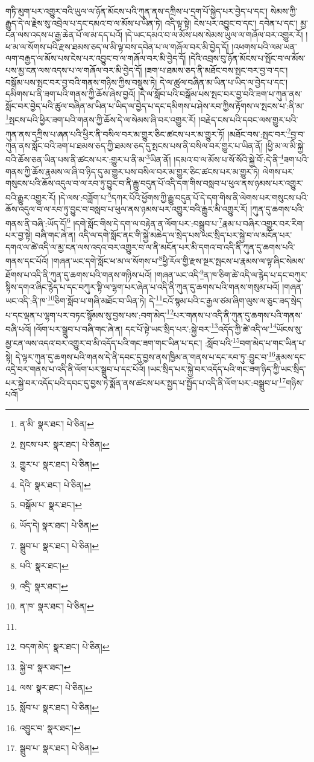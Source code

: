 གཏི་མུག་པར་འགྱུར་བའི་ཡུལ་ལ་ཉོན་མོངས་པའི་ཀུན་ནས་དཀྲིས་པ་དྲག་པོ་སྐྱེད་པར་བྱེད་པ་དང་། སེམས་ཀྱི་རྒྱུད་དེ་ལ་རྗེས་སུ་འབྲེལ་པ་དང་དམའ་བ་ལ་མོས་པ་ཡིན་ཏེ། འདི་ལྟ་སྟེ། ངེས་པར་འབྱུང་བ་དང་། དབེན་པ་དང་། མྱ་ངན་ལས་འདས་པ་རྒྱ་ཆེན་པོ་ལ་མ་དད་པའོ། །དེ་ཡང་དམའ་བ་ལ་མོས་པས་སེམས་ཡུལ་ལ་གཞོལ་བར་འགྱུར་རོ། །ཕ་མ་ལ་སོགས་པའི་རྫས་ཐམས་ཅད་ལ་མི་ལྟ་བས་དབེན་པ་ལ་གཞོལ་བར་མི་བྱེད་དོ། །འཕགས་པའི་ལམ་ཡན་ལག་བརྒྱད་ལ་མོས་པས་ངེས་པར་འབྱུང་བ་ལ་གཞོལ་བར་མི་བྱེད་དོ། །དེའི་འབྲས་བུ་ཉོན་མོངས་པ་སྤོང་བ་ལ་མོས་པས་མྱ་ངན་ལས་འདས་པ་ལ་གཞོལ་བར་མི་བྱེད་དོ། །ཟག་པ་ཐམས་ཅད་ནི་མཐོང་བས་སྤང་བར་བྱ་བ་དང་། བསྒོམ་པས་སྤང་བར་བྱ་བའི་གནས་གཉིས་ཀྱིས་བསྡུས་ཏེ། དེ་ལ་ཚུལ་བཞིན་མ་ཡིན་པ་ཡིད་ལ་བྱེད་པ་དང་། དམིགས་པ་ནི་ཟག་པའི་གནས་ཀྱི་ཆོས་ཞེས་བྱའོ། །དེ་ལ་སློབ་པའི་བསྒོམ་པས་སྤང་བར་བྱ་བའི་ཟག་པ་ཀུན་ནས་སློང་བར་བྱེད་པའི་ཚུལ་བཞིན་མ་ཡིན་པ་ཡིད་ལ་བྱེད་པ་དང་དམིགས་པ་ཤེས་རབ་ཀྱིས་རྟོགས་ལ་སྤངས་པ་:ནི་མ་\footnote{ན་མི་  སྣར་ཐང་།  པེ་ཅིན། }སྤངས་པའི་ཕྱིར་ཟག་པའི་གནས་ཀྱི་ཆོས་དེ་ལ་སེམས་ཞི་བར་འགྱུར་རོ། །བརྗེད་ངས་པའི་དབང་ལས་གྱུར་པའི་ཀུན་ནས་དཀྲིས་པ་ཞན་པའི་ཕྱིར་ནི་བསིལ་བར་མ་གྱུར་ཅིང་ཚངས་པར་མ་གྱུར་ཏོ། །མཐོང་བས་:སྤང་བར་\footnote{སྤངས་པར་  སྣར་ཐང་།  པེ་ཅིན། }བྱ་བ་ཀུན་ནས་སློང་བའི་ཟག་པ་ཐམས་ཅད་ཀྱི་ཐམས་ཅད་དུ་སྤངས་པས་ནི་བསིལ་བར་གྱུར་པ་ཡིན་ནོ། །ཕྱི་མ་ལ་མི་སྐྱེ་བའི་ཆོས་ཅན་ཡིན་པས་ནི་ཚངས་པར་:གྱུར་པ་ནི་མ་\footnote{གྱུར་པ་  སྣར་ཐང་།  པེ་ཅིན། }ཡིན་ནོ། །དམའ་བ་ལ་མོས་པ་སོ་སོའི་སྐྱེ་བོ་:དེ་ནི་\footnote{དེའི་  སྣར་ཐང་།  པེ་ཅིན། }ཟག་པའི་གནས་ཀྱི་ཆོས་རྣམས་ལ་ཞི་བ་ཉིད་དུ་མ་གྱུར་པས་བསིལ་བར་མ་གྱུར་ཅིང་ཚངས་པར་མ་གྱུར་ཏེ། ལེགས་པར་གསུངས་པའི་ཆོས་འདུལ་བ་ལ་རབ་ཏུ་བྱུང་བ་ནི་རྒྱུ་བདུན་པོ་འདི་དག་གིས་བསླབ་པ་ཕུལ་ནས་ཉམས་པར་འགྱུར་བའི་རྒྱུར་འགྱུར་རོ། །དེ་ལས་:བཟློག་པ་\footnote{བསྒོམ་པ་  སྣར་ཐང་། }དཀར་པོའི་ཕྱོགས་ཀྱི་རྒྱུ་བདུན་པོ་དེ་དག་གིས་ནི་ལེགས་པར་གསུངས་པའི་ཆོས་འདུལ་བ་ལ་རབ་ཏུ་བྱུང་བ་བསླབ་པ་ཕུལ་ནས་ཉམས་པར་འགྱུར་བའི་རྒྱུར་མི་འགྱུར་རོ། །ཀུན་དུ་ཆགས་པའི་གནས་ནི་བཞི་:ཡོད་དོ།\footnote{ཡོད་དེ།  སྣར་ཐང་།  པེ་ཅིན། } །དགེ་སློང་གིས་དེ་དག་ལ་བརྟེན་ན་ལོག་པར་:བསྒྲུབ་པ་\footnote{སྒྲུབ་པ་  སྣར་ཐང་།  པེ་ཅིན། }རྣམ་པ་བཞིར་འགྱུར་བར་རིག་པར་བྱ་སྟེ། བཞི་གང་ཞེ་ན། འདི་ལ་དགེ་སློང་ནང་གི་སྐྱེ་མཆེད་ལ་སྲེད་པས་ཡང་སྲིད་པར་སྐྱེ་བ་ལ་མངོན་པར་དགའ་ལ་ཚེ་འདི་ལ་མྱ་ངན་ལས་འདའ་བར་འགྱུར་བ་ལ་ནི་མངོན་པར་མི་དགའ་བ་འདི་ནི་ཀུན་དུ་ཆགས་པའི་གནས་དང་པོའོ། །གཞན་ཡང་དགེ་སློང་ཕ་མ་ལ་སོགས་པ་\footnote{པའི་  སྣར་ཐང་། }ཕྱི་རོལ་གྱི་རྫས་སྔར་སྤངས་པ་རྣམས་ལ་ལྟ་ཞིང་སེམས་ཐོགས་པ་འདི་ནི་ཀུན་དུ་ཆགས་པའི་གནས་གཉིས་པའོ། །གཞན་ཡང་འདི་\footnote{འདྲི་  སྣར་ཐང་། }ན་ཁ་ཅིག་ཚེ་འདི་ལ་རྙེད་པ་དང་བཀུར་སྟིས་དགའ་ཞིང་རྙེད་པ་དང་བཀུར་སྟི་ལ་ལྷག་པར་ཞེན་པ་འདི་ནི་ཀུན་དུ་ཆགས་པའི་གནས་གསུམ་པའོ། །གཞན་ཡང་འདི་:ནི་ཁ་\footnote{ན་ཁ་  སྣར་ཐང་།  པེ་ཅིན། }ཅིག་སློབ་པ་གཞི་མཐོང་བ་ཡིན་ཏེ། དེ་\footnote{}ངའོ་སྙམ་པའི་ང་རྒྱལ་ཙམ་ཞིག་ལུས་ལ་ཅུང་ཟད་སྲེད་པ་དང་ལྡན་པ་ལྷག་པར་བཏང་སྙོམས་སུ་བྱས་པས་:བག་མེད་\footnote{བདག་མེད་  སྣར་ཐང་།  པེ་ཅིན། }པར་གནས་པ་འདི་ནི་ཀུན་དུ་ཆགས་པའི་གནས་བཞི་པའོ། །ལོག་པར་སྒྲུབ་པ་བཞི་གང་ཞེ་ན། དང་པོ་སྟེ་ཡང་སྲིད་པར་:སྐྱེ་བར་\footnote{སྐྱེ་བ་  སྣར་ཐང་། }འདོད་ཀྱི་ཚེ་འདི་ལ་\footnote{ལས་  སྣར་ཐང་།  པེ་ཅིན། }ཡོངས་སུ་མྱ་ངན་ལས་འདའ་བར་འགྱུར་བ་མི་འདོད་པའི་གང་ཟག་གང་ཡིན་པ་དང་། :སློབ་པའི་\footnote{སློབ་པ་  སྣར་ཐང་།  པེ་ཅིན། }བག་མེད་པ་གང་ཡིན་པ་སྟེ། དེ་ལྟར་ཀུན་དུ་ཆགས་པའི་གནས་དེ་ནི་དབང་དུ་བྱས་ནས་ཁྱིམ་ན་གནས་པ་དང་རབ་ཏུ་:བྱུང་བ་\footnote{འབྱུང་བ་  སྣར་ཐང་། }རྣམས་དང་འདྲེ་བར་གནས་པ་འདི་ནི་ལོག་པར་སྒྲུབ་པ་དང་པོའོ། །ཡང་སྲིད་པར་སྐྱེ་བར་འདོད་པའི་གང་ཟག་ཉིད་ཀྱི་ཡང་སྲིད་པར་སྐྱེ་བར་འདོད་པའི་དབང་དུ་བྱས་ཏེ་སྨོན་ནས་ཚངས་པར་སྤྱད་པ་སྤྱོད་པ་འདི་ནི་ལོག་པར་:བསྒྲུབ་པ་\footnote{སྒྲུབ་པ་  སྣར་ཐང་།  པེ་ཅིན། }གཉིས་པའོ། 